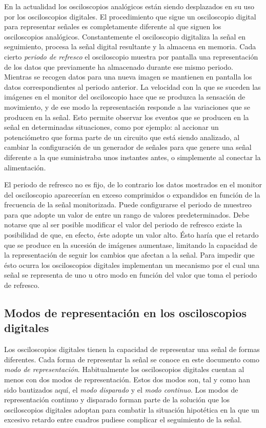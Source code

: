 En la actualidad los osciloscopios analógicos están siendo desplazados en
su uso por los osciloscopios digitales. El procedimiento que sigue un
osciloscopio digital para representar señales es completamente diferente al
que siguen los osciloscopios analógicos. Constantemente el osciloscopio
digitaliza la señal en seguimiento, procesa la señal digital resultante y
la almacena en memoria. Cada cierto \emph{periodo de refresco} el
osciloscopio muestra por pantalla una representación de los datos que
previamente ha almacenado durante ese mismo periodo. Mientras se recogen
datos para una nueva imagen se mantienen en pantalla los datos
correspondientes al periodo anterior. La velocidad con la que se suceden
las imágenes en el monitor del osciloscopio hace que se produzca la
sensación de movimiento, y de ese modo la representación responde a las
variaciones que se producen en la señal. Esto permite observar los eventos
que se producen en la señal en determinadas situaciones, como por ejemplo:
al accionar un potenciómetro que forma parte de un circuito que está siendo
analizado, al cambiar la configuración de un generador de señales para que
genere una señal diferente a la que suministraba unos instantes antes, o
simplemente al conectar la alimentación.

El periodo de refresco no es fijo, de lo contrario los datos mostrados en
el monitor del osciloscopio aparecerían en exceso comprimidos o expandidos
en función de la frecuencia de la señal monitorizada. Puede configurarse el
periodo de muestreo para que adopte un valor de entre un rango de valores
predeterminados. Debe notarse que al ser posible modificar el valor del
periodo de refresco existe la posibilidad de que, en efecto, éste adopte un
valor alto. Ésto haría que el retardo que se produce en la sucesión de
imágenes aumentase, limitando la capacidad de la representación de seguir
los cambios que afectan a la señal. Para impedir que ésto ocurra los
osciloscopios digitales implementan un mecanismo por el cual una señal se
representa de uno u otro modo en función del valor que toma el periodo de
refresco.


\subsection{Modos de representación en los osciloscopios digitales}\label{subsec:repmodes}

Los osciloscopios digitales tienen la capacidad de representar una señal de
formas diferentes. Cada forma de representar la señal se conoce en este
documento como \emph{modo de representación}. Habitualmente los
osciloscopios digitales cuentan al menos con dos modos de representación.
Estos dos modos son, tal y como han sido bautizados aquí, el \emph{modo
disparado} y el \emph{modo continuo}. Los modos de representación continuo
y disparado forman parte de la solución que los osciloscopios digitales
adoptan para combatir la situación hipotética en la que un excesivo retardo
entre cuadros pudiese complicar el seguimiento de la señal.

